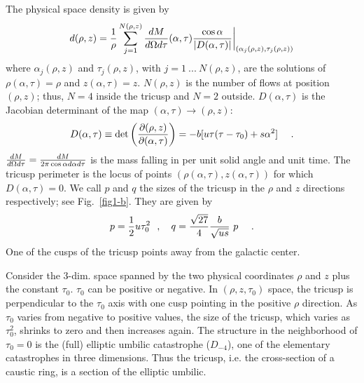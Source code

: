 \documentclass[aps,prd,preprint,tightenlines,floatfix,showpacs,groupedaddress]{revtex4}
\begin{document}
The physical space density is given by
\begin{equation}
d(\rho, z) = {1 \over \rho} \sum_{j=1}^{N(\rho,z)}
{dM \over d\Omega d\tau}(\alpha,\tau)
{\cos\alpha \over |D(\alpha, \tau)|}
\bigg|_{(\alpha_j(\rho,z), \tau_j(\rho,z))}
\label{den}
\end{equation}
where $\alpha_j(\rho,z)$ and $\tau_j(\rho,z)$, with 
$j = 1~...~N(\rho,z)$, are the solutions of $\rho(\alpha,\tau) = \rho$
and $z(\alpha,\tau) = z$. $N(\rho,z)$ is the number of flows at 
position $(\rho,z)$; thus, $N=4$ inside the tricusp and $N=2$ 
outside.  $D(\alpha,\tau)$ is the Jacobian determinant of the 
map $(\alpha,\tau) \rightarrow (\rho,z)$:
\begin{equation}
D(\alpha,\tau) \equiv
\det\left({\partial(\rho,z) \over \partial (\alpha,\tau)}\right)
= - b [u \tau (\tau - \tau_0) + s \alpha^2]~~~\ .
\label{D}
\end{equation}
${dM \over d\Omega d\tau} = {dM \over 2 \pi \cos\alpha d\alpha d\tau}$
is the mass falling in per unit solid angle and unit time.  The tricusp 
perimeter is the locus of points $(\rho(\alpha, \tau), z(\alpha, \tau))$ 
for which $D(\alpha, \tau) = 0$.  We call $p$ and $q$ the sizes of the
tricusp in the $\rho$ and $z$ directions respectively; see Fig.~\ref{fig1-b}.  
They are given by 
\begin{equation}
p = {1 \over 2} u \tau_0^2~~,~~~ 
q = {\sqrt{27} \over 4} {b \over \sqrt{us}}~p~~~\ .
\label{pq}
\end{equation}
One of the cusps of the tricusp points away from the galactic center.

Consider the 3-dim. space spanned by the two physical coordinates 
$\rho$ and $z$ plus the constant $\tau_0$.  $\tau_0$ can be positive 
or negative.  In $(\rho, z, \tau_0)$ space, the tricusp is perpendicular
to the $\tau_0$ axis with one cusp pointing in the positive $\rho$
direction.  As $\tau_0$ varies from negative to positive values, 
the size of the tricusp, which varies as $\tau_0^2$, shrinks to zero
and then increases again.  The structure in the neighborhood of 
$\tau_0 = 0$ is the (full) elliptic umbilic catastrophe ($D_{-4}$), 
one of the elementary catastrophes in three dimensions.  Thus the 
tricusp, i.e. the cross-section of a caustic ring, is a section of 
the elliptic umbilic.
\end{document}
